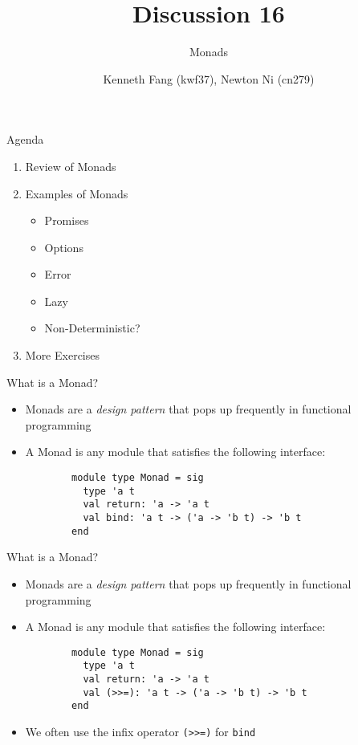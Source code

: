 \documentclass{beamer}
\title{Discussion 16}
\subtitle{Monads}
\author{Kenneth Fang (kwf37), Newton Ni (cn279)}
\begin{document}
    \begin{frame}
        \titlepage{}
    \end{frame}
    
    \begin{frame}{Agenda}
    \begin{enumerate}
        \item Review of Monads
        \item Examples of Monads
        \begin{itemize}
            \item Promises
            \item Options
            \item Error
            \item Lazy
            \item Non-Deterministic?
        \end{itemize}
        \item More Exercises
    \end{enumerate}
    \end{frame}
    
    \begin{frame}[fragile]{What is a Monad?}
    \begin{itemize}
        \item Monads are a \textit{design pattern} that pops up frequently in functional programming \pause
        \item A Monad is any module that satisfies the following interface:
        
        \begin{verbatim}
        module type Monad = sig
          type 'a t
          val return: 'a -> 'a t
          val bind: 'a t -> ('a -> 'b t) -> 'b t
        end
        \end{verbatim}
    \end{itemize}
    \end{frame}
    
    \begin{frame}[fragile]{What is a Monad?}
    \begin{itemize}
        \item Monads are a \textit{design pattern} that pops up frequently in functional programming
        
        \item A Monad is any module that satisfies the following interface:
        
        \begin{verbatim}
        module type Monad = sig
          type 'a t
          val return: 'a -> 'a t
          val (>>=): 'a t -> ('a -> 'b t) -> 'b t
        end
        \end{verbatim}
        
        \item We often use the infix operator \texttt{(>>=)} for \texttt{bind}
    \end{itemize}
    \end{frame}
    
\end{document}
